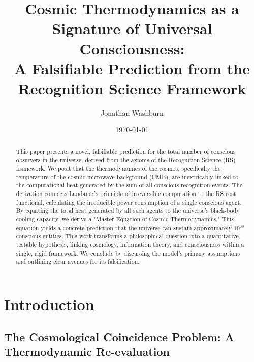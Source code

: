 \documentclass[12pt, aip, jcp]{revtex4-2} %
\begin{document}
\title{Cosmic Thermodynamics as a Signature of Universal Consciousness:\\A Falsifiable Prediction from the Recognition Science Framework}

\author{Jonathan Washburn}

\date{\today}

\begin{abstract}
\noindent This paper presents a novel, falsifiable prediction for the total number of conscious observers in the universe, derived from the axioms of the Recognition Science (RS) framework. We posit that the thermodynamics of the cosmos, specifically the temperature of the cosmic microwave background (CMB), are inextricably linked to the computational heat generated by the sum of all conscious recognition events. The derivation connects Landauer's principle of irreversible computation to the RS cost functional, calculating the irreducible power consumption of a single conscious agent. By equating the total heat generated by all such agents to the universe's black-body cooling capacity, we derive a "Master Equation of Cosmic Thermodynamics." This equation yields a concrete prediction that the universe can sustain approximately \(10^{68}\) conscious entities. This work transforms a philosophical question into a quantitative, testable hypothesis, linking cosmology, information theory, and consciousness within a single, rigid framework. We conclude by discussing the model's primary assumptions and outlining clear avenues for its falsification.
\end{abstract}

\maketitle

\section{Introduction}

\subsection{The Cosmological Coincidence Problem: A Thermodynamic Re-evaluation}
\end{document}
